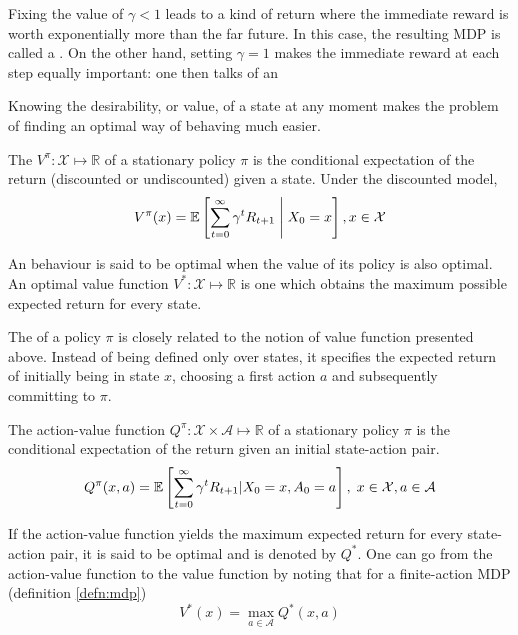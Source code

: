 Fixing the value of $\gamma < 1$ leads to a kind of return where the immediate
reward is worth exponentially more than the far future. In this case, the resulting MDP 
is called a . On the other hand, setting $\gamma =
1$ makes the immediate reward at each step equally important: one 
then talks of an 

Knowing the desirability, or value, of a state at any moment makes the problem of finding an optimal way of behaving much easier.
\begin{defn}
The  $V^\pi: \mathcal{X} \mapsto \mathbb{R}$ of a
stationary policy $\pi$ is the conditional expectation of the return (discounted or
undiscounted) given a state. Under the discounted model, 
\begin{equation} 
V^\pi(x) = \operatorname{\mathbb{E}} \left[ \sum_{t=0}^\infty \gamma^t R_{t+1}  \;\middle\vert\;  X_0 =
x\right] , x \in \mathcal{X} \label{eq:value-function}
\end{equation}
\end{defn}

An behaviour is said to be optimal when the value of its policy is also optimal. An
optimal value function $V^*: \mathcal{X} \mapsto \mathbb{R}$ is one which obtains
the maximum possible expected return for every state.

The  of a policy $\pi$ is closely related to the notion of
value function presented above. Instead of being defined only over states, it specifies
the expected return of initially being in state $x$, choosing a first action $a$ and subsequently committing to $\pi$. 
\begin{defn}
The action-value function $Q^\pi: \mathcal{X} \times \mathcal{A} \mapsto
\mathbb{R}$ of a stationary policy $\pi$ is the conditional expectation of the return
given an initial state-action pair. 
\begin{equation}
Q^\pi(x, a) = \operatorname{\mathbb{E}} \left[ \sum_{t=0}^\infty \gamma^t R_{t+1} \vert X_0 = x,
A_0 = a \right], \; x \in \mathcal{X}, a \in \mathcal{A}
\end{equation}
\end{defn}

If the action-value function yields the maximum expected return for every state-action pair, it is said to be optimal and is denoted by $Q^*$. One can go from the
action-value function to the value function by noting that for a finite-action MDP
(definition \ref{defn:mdp})
\begin{equation}
V^*(x) = \max_{a \in \mathcal{A}} Q^*(x, a) \label{eq:qopt-to-vopt}
\end{equation}


